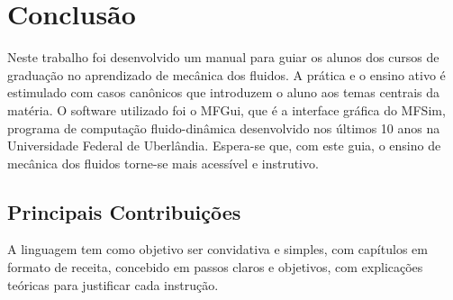 \chapter[Conclusão]{Conclusão}
Neste trabalho foi desenvolvido um manual para guiar os alunos dos cursos de graduação no aprendizado de mecânica dos fluidos. A prática e o ensino ativo é estimulado com casos canônicos que introduzem o aluno aos temas centrais da matéria. O software utilizado foi o MFGui, que é a interface gráfica do MFSim, programa de computação fluido-dinâmica desenvolvido nos últimos 10 anos na Universidade Federal de Uberlândia. Espera-se que, com este guia, o ensino de mecânica dos fluidos torne-se mais acessível e instrutivo.

\section{Principais Contribuições}

A linguagem tem como objetivo ser convidativa e simples, com capítulos em formato de receita, concebido em passos claros e objetivos, com explicações teóricas para justificar cada instrução.
